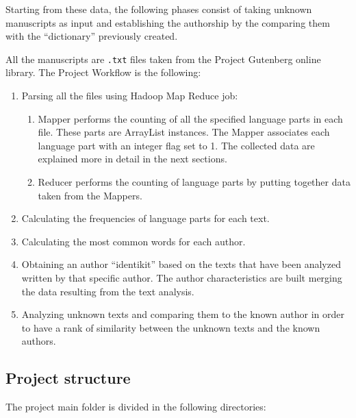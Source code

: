 \documentclass[a4paper,11pt, twoside]{article}
\begin{document}
	Starting from these data, the following phases consist of taking unknown manuscripts as input and establishing the authorship by the comparing them with the ``dictionary'' previously created. 
	
	All the manuscripts are \texttt{.txt} files taken from the Project Gutenberg \parencite{Gutenberg} online library.
	The Project Workflow is the following:
	\begin{enumerate}
		\item Parsing all the files using Hadoop Map Reduce job: 
		\begin{enumerate}
			\item Mapper performs the counting of all the specified language parts in each file. These parts are ArrayList instances. The Mapper associates each language part with an integer flag set to 1. The collected data are explained more in detail in the next sections. 
			
			\item Reducer performs the counting of language parts by putting together data taken from the Mappers.
		\end{enumerate}
		\item Calculating the frequencies of language parts for each text.
		\item Calculating the most common words for each author.
		\item Obtaining an author ``identikit'' based on the texts that have been analyzed written by that specific author. The author characteristics are built merging the data resulting from the text analysis.
		\item Analyzing unknown texts and comparing them to the known author in order to have a rank of similarity between the unknown texts and the known authors.
	\end{enumerate}

	\subsection{Project structure}
		The project main folder is divided in the following directories:
		\begin{figure}[h!]
		\end{figure}
\end{document}
